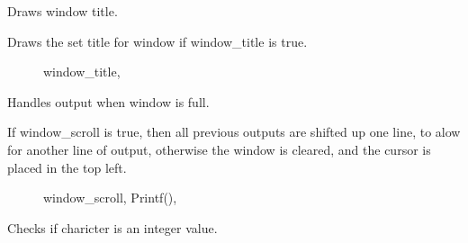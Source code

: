 \documentclass[letterpaper,10pt,english]{sphinxmanual}
\begin{document}
\begin{fulllineitems}

\begin{fulllineitems}
\label{\detokenize{index:_CPPv2N7ostendo6Window9DrawTitleEv}}%
\pysigstartmultiline
{}\label{\detokenize{index:Pessumclassostendo_1_1Window_1a53fc7533923da80c2ca9f9e66d0ba775}}%
\pysigstopmultiline
Draws window title. 

Draws the set title for window if window\_title is true. \begin{description}
\item[{}] \leavevmode
window\_title, {\hyperref[\detokenize{index:Pessumclassostendo_1_1Window_1a7772b7589637c6ddebd87697c47aefc3}]{}} 

\end{description}


\end{fulllineitems}


\begin{fulllineitems}
\label{\detokenize{index:_CPPv2N7ostendo6Window8LastLineEv}}%
\pysigstartmultiline
{}\label{\detokenize{index:Pessumclassostendo_1_1Window_1a2acb1266b04bd95a4f3f96d5c35d1cdf}}%
\pysigstopmultiline
Handles output when window is full. 

If window\_scroll is true, then all previous outputs are shifted up one line, to alow for another line of output, otherwise the window is cleared, and the cursor is placed in the top left. \begin{description}
\item[{}] \leavevmode
window\_scroll, Printf(), {\hyperref[\detokenize{index:Pessumclassostendo_1_1Window_1ac02e38f9ad5b08a18f3bcc7b70a0944e}]{}} 

\end{description}


\end{fulllineitems}


\begin{fulllineitems}
\label{\detokenize{index:_CPPv2N7ostendo6Window5IsIntEc}}%
\pysigstartmultiline
{}\label{\detokenize{index:Pessumclassostendo_1_1Window_1aec58b5ba2a2f8d8dc6555c7c7291f08d}}%
\pysigstopmultiline
Checks if charicter is an integer value. 


\end{fulllineitems}
\end{fulllineitems}
\end{document}
